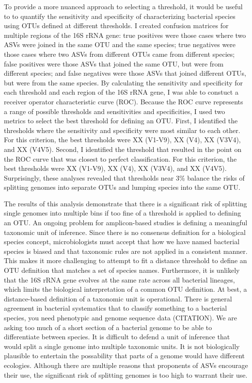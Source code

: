 \documentclass[
]{article}
\begin{document}
To provide a more nuanced approach to selecting a threshold, it would be
useful to to quantify the sensitivity and specificity of characterizing
bacterial species using OTUs defined at different thresholds. I created
confusion matrices for multiple regions of the 16S rRNA gene: true
positives were those cases where two ASVs were joined in the same OTU
and the same species; true negatives were those cases where two ASVs
from different OTUs came from different species; false positives were
those ASVs that joined the same OTU, but were from different species;
and false negatives were those ASVs that joined different OTUs, but were
from the same species. By calculating the sensitivity and specificity
for each threshold and each region of the 16S rRNA gene, I was able to
constuct a receiver operator characteristic curve (ROC). Because the ROC
curve represents a range of possible thresholds and sensitivities and
specificities, I used two metrics to select the best threshold for
defining an OTU. First, I identified the thresholds where the
sensitivity and specificity were most similar to each other. For this
criterion, the best thresholds were XX (V1-V9), XX (V4), XX (V3V4), and
XX (V4V5). Second, I identified the threshold that resulted in the point
on the ROC curve that was closest to perfect classification. For this
criterion, the best thresholds were XX (V1-V9), XX (V4), XX (V3V4), and
XX (V4V5). Surprisingly, these analyses revealed that thresholds near
3\% balance the risks of splitting genomes into separate OTUs and
lumping species into the same OTU.

The results of this analysis demonstrate that there is a significant
risk of splitting single genomes into multiple bins if too fine of a
threshold is applied to defining an OTU. An ongoing problem for
amplicon-based studies is defining a meaningful taxonomic unit of
inference. Since there is no consensus definition for a biological
species concept, microbiologists must accept that how we have named
bacterial species is biased and that taxonomic rules are not applied in
a consistent manner. This makes it more challenging to attempt to fit a
distance threshold to define an OTU definition that matches a set of
species names. Furthermore, it is unlikely that the 16S rRNA gene
evolves at the same rate across all bacterial lineages, which limits the
biological interpretation of a common OTU definition. At best, a
distance-based definition of a taxonomic unit is operational. There is
general agreement in bacterial systematics that to classify something to
a bacterial species, you need phenotypic and genome sequence data
(CITATION). We are asking too much of a short section of a bacterial
genome to be able to differentiate between species. It is difficult to
defend a unit of inference that would split a single genome into
multiple taxonomic units. It is not biologically plausible to entertain
the possability that parts of a genome would have different ecologies.
Although there are multiple reasons that proponents of ASVs encourage
their use, the significant risk of splitting genomes is too high to
warrant their use.
\end{document}
